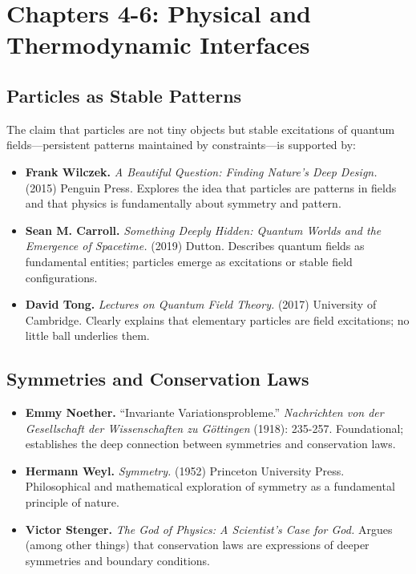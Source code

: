 \documentclass[
  openright]{book}
\begin{document}
\section{Chapters 4-6: Physical and Thermodynamic
Interfaces}\label{chapters-4-6-physical-and-thermodynamic-interfaces}

\subsection{Particles as Stable
Patterns}\label{particles-as-stable-patterns}

The claim that particles are not tiny objects but stable excitations of
quantum fields---persistent patterns maintained by constraints---is
supported by:

\begin{itemize}
\item
  \textbf{Frank Wilczek.} \emph{A Beautiful Question: Finding Nature's
  Deep Design.} (2015) Penguin Press. Explores the idea that particles
  are patterns in fields and that physics is fundamentally about
  symmetry and pattern.
\item
  \textbf{Sean M. Carroll.} \emph{Something Deeply Hidden: Quantum
  Worlds and the Emergence of Spacetime.} (2019) Dutton. Describes
  quantum fields as fundamental entities; particles emerge as
  excitations or stable field configurations.
\item
  \textbf{David Tong.} \emph{Lectures on Quantum Field Theory.} (2017)
  University of Cambridge. Clearly explains that elementary particles
  are field excitations; no little ball underlies them.
\end{itemize}

\subsection{Symmetries and Conservation
Laws}\label{symmetries-and-conservation-laws}

\begin{itemize}
\item
  \textbf{Emmy Noether.} ``Invariante Variationsprobleme.''
  \emph{Nachrichten von der Gesellschaft der Wissenschaften zu
  Göttingen} (1918): 235-257. Foundational; establishes the deep
  connection between symmetries and conservation laws.
\item
  \textbf{Hermann Weyl.} \emph{Symmetry.} (1952) Princeton University
  Press. Philosophical and mathematical exploration of symmetry as a
  fundamental principle of nature.
\item
  \textbf{Victor Stenger.} \emph{The God of Physics: A Scientist's Case
  for God.} Argues (among other things) that conservation laws are
  expressions of deeper symmetries and boundary conditions.
\end{itemize}
\end{document}
